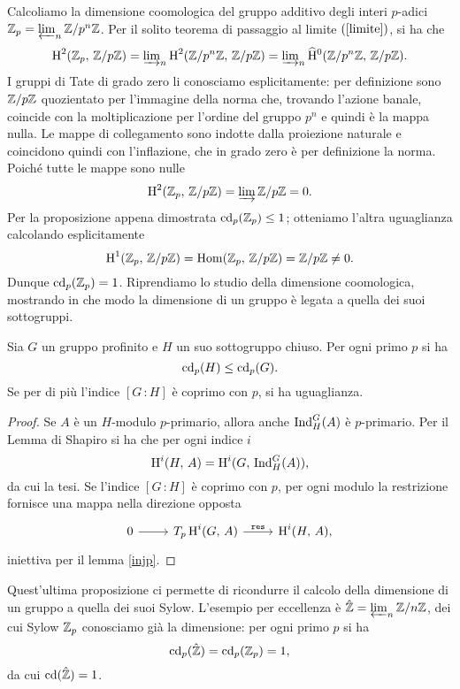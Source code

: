 Calcoliamo la dimensione coomologica del gruppo additivo degli interi $ p $-adici $ \mathbb{Z}_p = \varprojlim_n \mathbb{Z}/p^n\mathbb{Z} $. Per il solito teorema di passaggio al limite $ (\ref{limite}) $, si ha che 
\[ \operatorname{H}^2(\mathbb{Z}_p , \, \mathbb{Z}/p\mathbb{Z}) = {\textstyle\varinjlim_n} \operatorname{H}^2(\mathbb{Z}/p^n\mathbb{Z}, \, \mathbb{Z}/p\mathbb{Z}) = {\textstyle\varinjlim_n} \operatorname{\widehat{H}^{0}}(\mathbb{Z}/p^n\mathbb{Z}, \, \mathbb{Z}/p\mathbb{Z}). \]
I gruppi di Tate di grado zero li conosciamo esplicitamente: per definizione sono $ \mathbb{Z}/p\mathbb{Z} $ quozientato per l'immagine della norma che, trovando l'azione banale, coincide con la moltiplicazione per l'ordine del gruppo $ p^n $ e quindi è la mappa nulla. Le mappe di collegamento sono indotte dalla proiezione naturale e coincidono quindi con l'inflazione, che in grado zero è per definizione la norma. Poiché tutte le mappe sono nulle
\[ \operatorname{H}^2(\mathbb{Z}_p , \, \mathbb{Z}/p\mathbb{Z}) = \varinjlim \mathbb{Z}/p\mathbb{Z} = 0. \]
Per la proposizione appena dimostrata $ \operatorname{cd}_p(\mathbb{Z}_p) \leq 1 $; otteniamo l'altra uguaglianza calcolando esplicitamente $$  \operatorname{H}^1(\mathbb{Z}_p , \, \mathbb{Z}/p\mathbb{Z}) = \operatorname{Hom}(\mathbb{Z}_p , \, \mathbb{Z}/p\mathbb{Z}) = \mathbb{Z}/p\mathbb{Z} \neq 0.  $$
Dunque $ \operatorname{cd}_p(\mathbb{Z}_p) = 1 $.
Riprendiamo lo studio della dimensione coomologica, mostrando in che modo la dimensione di un gruppo è legata a quella dei suoi sottogruppi.

\begin{proposition}\label{cd2}
	Sia $ G $ un gruppo profinito e $ H $ un suo sottogruppo chiuso. Per ogni primo $ p $ si ha
	\[ \operatorname{cd}_p(H) \leq \operatorname{cd}_p(G). \]
	Se per di più l'indice $ [G\,\colon H] $ è coprimo con $ p $, si ha uguaglianza.
\end{proposition}
\begin{proof}
	Se $ A $ è un $ H $-modulo $ p $-primario, allora anche $ \operatorname{Ind}_H^G(A) $ è $ p $-primario. Per il Lemma di Shapiro si ha che per ogni indice $ i $
	\[ \operatorname{H}^i(H, \, A) = \operatorname{H}^i(G, \, \operatorname{Ind}_H^G(A)),  \]
	da cui la tesi. Se l'indice $ [G\,\colon H] $ è coprimo con $ p $, per ogni modulo la restrizione fornisce una mappa nella direzione opposta
	\[\begin{tikzcd}
	0 \rar & T_p\HH^i(G, \, A) \rar["\Res"] & \HH^i(H, \, A),
	\end{tikzcd}  \]
	iniettiva per il lemma \ref{injp}.
\end{proof}

Quest'ultima proposizione ci permette di ricondurre il calcolo della dimensione di un gruppo a quella dei suoi Sylow. L'esempio per eccellenza è $ \hat{\mathbb{Z}} = \varprojlim_n \mathbb{Z}/n\mathbb{Z} $, dei cui Sylow $ \mathbb{Z}_p$ conosciamo già la dimensione: per ogni primo $ p $ si ha
\[ \operatorname{cd}_p(\hat{\mathbb{Z}}) = \operatorname{cd}_p(\mathbb{Z}_p) = 1, \]
da cui $ \operatorname{cd}(\hat{\mathbb{Z}})=1 $.\\

